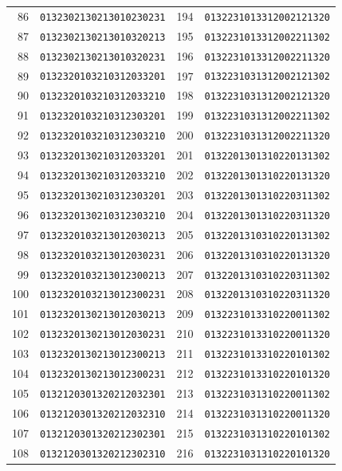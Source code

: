 \documentclass[aps,pra,reprint,superscriptaddress,longbibliography,nofootinbib,floatfix,10pt]{revtex4-2}
\theoremstyle{definition}
\begin{document}
\begin{longtable}{rl@{\qquad}rl}
86 & \texttt{0132302130213010230231} & 194 & \texttt{0132231013312002121320}\\
87 & \texttt{0132302130213010320213} & 195 & \texttt{0132231013312002211302}\\
88 & \texttt{0132302130213010320231} & 196 & \texttt{0132231013312002211320}\\
89 & \texttt{0132320103210312033201} & 197 & \texttt{0132231031312002121302}\\
90 & \texttt{0132320103210312033210} & 198 & \texttt{0132231031312002121320}\\
91 & \texttt{0132320103210312303201} & 199 & \texttt{0132231031312002211302}\\
92 & \texttt{0132320103210312303210} & 200 & \texttt{0132231031312002211320}\\
93 & \texttt{0132320130210312033201} & 201 & \texttt{0132201301310220131302}\\
94 & \texttt{0132320130210312033210} & 202 & \texttt{0132201301310220131320}\\
95 & \texttt{0132320130210312303201} & 203 & \texttt{0132201301310220311302}\\
96 & \texttt{0132320130210312303210} & 204 & \texttt{0132201301310220311320}\\
97 & \texttt{0132320103213012030213} & 205 & \texttt{0132201310310220131302}\\
98 & \texttt{0132320103213012030231} & 206 & \texttt{0132201310310220131320}\\
99 & \texttt{0132320103213012300213} & 207 & \texttt{0132201310310220311302}\\
100 & \texttt{0132320103213012300231} & 208 & \texttt{0132201310310220311320}\\
101 & \texttt{0132320130213012030213} & 209 & \texttt{0132231013310220011302}\\
102 & \texttt{0132320130213012030231} & 210 & \texttt{0132231013310220011320}\\
103 & \texttt{0132320130213012300213} & 211 & \texttt{0132231013310220101302}\\
104 & \texttt{0132320130213012300231} & 212 & \texttt{0132231013310220101320}\\
105 & \texttt{0132120301320212032301} & 213 & \texttt{0132231031310220011302}\\
106 & \texttt{0132120301320212032310} & 214 & \texttt{0132231031310220011320}\\
107 & \texttt{0132120301320212302301} & 215 & \texttt{0132231031310220101302}\\
108 & \texttt{0132120301320212302310} & 216 & \texttt{0132231031310220101320}\\
\end{longtable}\endgroup
\end{document}
